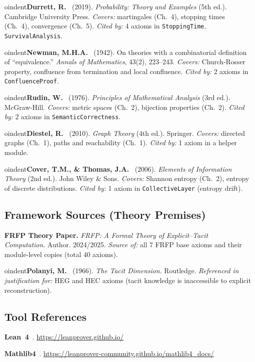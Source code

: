 \medskip

oindent\textbf{Durrett, R.}~\cite{Durrett2019} (2019).
\textit{Probability: Theory and Examples} (5th ed.).
Cambridge University Press.
\textit{Covers:} martingales (Ch.~4), stopping times (Ch.~4), convergence (Ch.~5).
\textit{Cited by:} 4 axioms in \texttt{StoppingTime}, \texttt{SurvivalAnalysis}.

\medskip

oindent\textbf{Newman, M.H.A.}~\cite{Newman1942} (1942).
On theories with a combinatorial definition of ``equivalence.''
\textit{Annals of Mathematics}, 43(2), 223--243.
\textit{Covers:} Church-Rosser property, confluence from termination and local confluence.
\textit{Cited by:} 2 axioms in \texttt{ConfluenceProof}.

\medskip

oindent\textbf{Rudin, W.}~\cite{Rudin1976} (1976).
\textit{Principles of Mathematical Analysis} (3rd ed.).
McGraw-Hill.
\textit{Covers:} metric spaces (Ch.~2), bijection properties (Ch.~2).
\textit{Cited by:} 2 axioms in \texttt{SemanticCorrectness}.

\medskip

oindent\textbf{Diestel, R.}~\cite{Diestel2010} (2010).
\textit{Graph Theory} (4th ed.).
Springer.
\textit{Covers:} directed graphs (Ch.~1), paths and reachability (Ch.~1).
\textit{Cited by:} 1 axiom in a helper module.

\medskip

oindent\textbf{Cover, T.M., \& Thomas, J.A.}~\cite{CoverThomas2006} (2006).
\textit{Elements of Information Theory} (2nd ed.).
John Wiley \& Sons.
\textit{Covers:} Shannon entropy (Ch.~2), entropy of discrete distributions.
\textit{Cited by:} 1 axiom in \texttt{CollectiveLayer} (entropy drift).

\subsection*{Framework Sources (Theory Premises)}

\noindent\textbf{FRFP Theory Paper.}
\textit{FRFP: A Formal Theory of Explicit--Tacit Computation.}
Author. 2024/2025.
\textit{Source of:} all 7 FRFP base axioms and their module-level copies (total 40 axioms).

\medskip

oindent\textbf{Polanyi, M.}~\cite{Polanyi1966} (1966).
\textit{The Tacit Dimension.}
Routledge.
\textit{Referenced in justification for:} HEG and HEC axioms (tacit knowledge is
inaccessible to explicit reconstruction).

\subsection*{Tool References}

\noindent\textbf{Lean~4}~\cite{deMoura2021Lean4}.
\url{https://leanprover.github.io/}

\medskip

\noindent\textbf{Mathlib4}~\cite{Mathlib2020}.
\url{https://leanprover-community.github.io/mathlib4_docs/}

